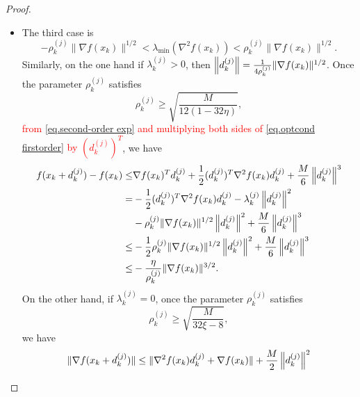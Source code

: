 \begin{proof}
\begin{itemize}
\begin{align}
                                        \label{eq.gradient norm adaptive case 2}
                  &\leq \xi\|\nabla f(x_k)\|.
              \end{align}        
              It is easy to see the function value is decreasing.
        \item The third case is
              $$-\rho_k^{(j)}\|\nabla f(x_k)\|^{1/2}<\lambda_{\min}(\nabla^2 f(x_k)) < \rho_k^{(j)}\|\nabla f(x_k)\|^{1/2}.$$
              Similarly, on the one hand if $\lambda_k^{(j)}>0$, then $\left\|d_k^{(j)}\right\| = \frac{1}{4\rho_k^{(j)}}\|\nabla f(x_k)\|^{1/2}$.
              Once the parameter $\rho_k^{(j)}$ satisfies
    $$
        \rho_k^{(j)} \geq \sqrt{\frac{M}{12(1-32\eta)}},
    $$
              \textcolor{red}{from \eqref{eq.second-order exp} and multiplying both sides of \eqref{eq.optcond firstorder} by $\left(d_k^{(j)}\right)^T$}, we have
              \begin{align}
                  \nonumber
                  f(x_k+d_k^{(j)})-f(x_k)  \leq& \nabla f(x_k)^Td_k^{(j)}+\frac{1}{2}(d_k^{(j)})^T \nabla^2 f(x_k)d_k^{(j)}+\frac{M}{6}\left\|d_k^{(j)}\right\|^3                                                          \\
                  \nonumber
                                           =& -\frac{1}{2}(d_k^{(j)})^T \nabla^2 f(x_k)d_k^{(j)} -\lambda_k^{(j)}\left\|d_k^{(j)}\right\|^2\\
                                          \nonumber
                                          &-\rho_k^{(j)}\|\nabla f(x_k)\|^{1/2} \left\|d_k^{(j)}\right\|^2+\frac{M}{6}\left\|d_k^{(j)}\right\|^3 \\
                  \nonumber
                                           \leq& -\frac{1}{2}\rho_k^{(j)}\|\nabla f(x_k)\|^{1/2}\left\|d_k^{(j)}\right\|^2+\frac{M}{6}\left\|d_k^{(j)}\right\|^3                                                               \\
                                           \leq& -\frac{\eta}{\rho_k^{(j)}}\|\nabla f(x_k)\|^{3/2}.
                  \label{eq.function decrease adaptive case3}
              \end{align}
              On  the other hand, if $\lambda_k^{(j)} = 0$, once the parameter $\rho_k^{(j)}$ satisfies
    $$
        \rho_k^{(j)} \geq \sqrt{\frac{M}{32\xi-8}},
    $$ we have
              \begin{align}
                  \nonumber
                  \|\nabla f(\xk+\dk^{(j)})\| & \leq \|\nabla^2 f(x_k)\dk^{(j)}+\nabla f(x_k)\| +\frac{M}{2}\left\|\dk^{(j)}\right\|^2         \\

\end{align}
\end{itemize}
\end{proof}
